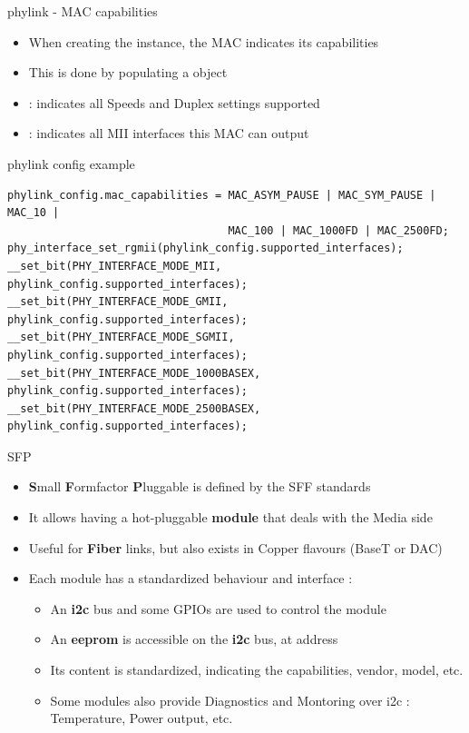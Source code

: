\begin{frame}[fragile]{phylink - MAC capabilities}
	\begin{itemize}
		\item When creating the  instance, the MAC indicates its capabilities
		\item This is done by populating a  object
		\item {} : indicates all Speeds and Duplex settings supported
		\item {} : indicates all MII interfaces this MAC can output
	\end{itemize}
	\begin{block}{phylink config example}
	{\fontsize{9}{10}
	\begin{verbatim}
phylink_config.mac_capabilities = MAC_ASYM_PAUSE | MAC_SYM_PAUSE | MAC_10 |
                                  MAC_100 | MAC_1000FD | MAC_2500FD;
phy_interface_set_rgmii(phylink_config.supported_interfaces);
__set_bit(PHY_INTERFACE_MODE_MII, phylink_config.supported_interfaces);
__set_bit(PHY_INTERFACE_MODE_GMII, phylink_config.supported_interfaces);
__set_bit(PHY_INTERFACE_MODE_SGMII, phylink_config.supported_interfaces);
__set_bit(PHY_INTERFACE_MODE_1000BASEX, phylink_config.supported_interfaces);
__set_bit(PHY_INTERFACE_MODE_2500BASEX, phylink_config.supported_interfaces);
	\end{verbatim}
	}
	\end{block}
\end{frame}

\begin{frame}{SFP}
	\begin{itemize}
		\item \textbf{S}mall \textbf{F}ormfactor \textbf{P}luggable is defined by the SFF standards
		\item It allows having a hot-pluggable \textbf{module} that deals with the Media side
		\item Useful for \textbf{Fiber} links, but also exists in Copper flavours (BaseT or DAC)
		\item Each module has a standardized behaviour and interface :
			\begin{itemize}
				\item An \textbf{i2c} bus and some GPIOs are used to control the module
				\item An \textbf{eeprom} is accessible on the \textbf{i2c} bus, at address 
				\item Its content is standardized, indicating the capabilities, vendor, model, etc.
				\item Some modules also provide Diagnostics and Montoring over i2c : Temperature, Power output, etc.
			\end{itemize}
	\end{itemize}
\end{frame}

